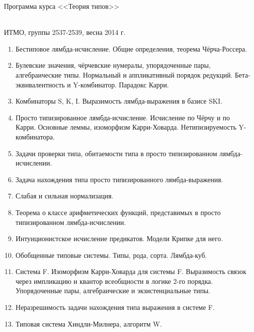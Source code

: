 \documentclass[12pt,a4paper,oneside]{book}
\begin{document}
\begin{center}
\begin{Large}Программа курса <<Теория типов>>\end{Large}\\
ИТМО, группы 2537-2539, весна 2014 г.
\end{center}

\begin{enumerate}
\item Бестиповое лямбда-исчисление. Общие определения, теорема Чёрча-Россера.
\item Булевские значения, чёрчевские нумералы, упорядоченные пары, 
алгебраические типы. Нормальный и аппликативный порядок редукций.
Бета-эквивалентность и Y-комбинатор. Парадокс Карри.
\item Комбинаторы S, K, I. Выразимость лямбда-выражения в базисе SKI.
\item Просто типизированное лямбда-исчисление. Исчисление по Чёрчу и по Карри.
Основные леммы, изоморфизм Карри-Ховарда. Нетипизируемость Y-комбинатора.
\item Задачи проверки типа, обитаемости типа в просто типизированном лямбда-исчислении.
\item Задача нахождения типа просто типизированного лямбда-выражения.
\item Слабая и сильная нормализация.
\item Теорема о классе арифметических функций, представимых в просто типизированном лямбда-исчислении.
\item Интуиционистское исчисление предикатов. Модели Крипке для него.
\item Обобщенные типовые системы. Типы, рода, сорта. Лямбда-куб.
\item Система F. Изоморфизм Карри-Ховарда для системы F.
Выразимость связок через импликацию и квантор всеобщности в логике 2-го порядка.
Упорядоченные пары, алгебраические и экзистенциальные типы.
\item Неразрешимость задачи нахождения типа выражения в системе F.
\item Типовая система Хиндли-Милнера, алгоритм W.
\end{enumerate}
\end{document}
